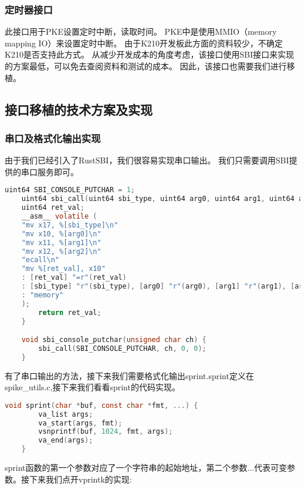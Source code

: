 \subsubsection{定时器接口}

此接口用于PKE设置定时中断，读取时间。
PKE中是使用MMIO（memory mapping IO）来设置定时中断。
由于K210开发板此方面的资料较少，不确定K210是否支持此方式。
从减少开发成本的角度考虑，该接口使用SBI接口来实现的方案最低，可以免去查阅资料和测试的成本。
因此，该接口也需要我们进行移植。

\subsection{接口移植的技术方案及实现}

\subsubsection{串口及格式化输出实现}

由于我们已经引入了RustSBI，我们很容易实现串口输出。
我们只需要调用SBI提供的串口服务即可。

\begin{lstlisting}[language=C, caption={串口实现代码}, label={lst:serial_output} ]
    uint64 SBI_CONSOLE_PUTCHAR = 1;
    uint64 sbi_call(uint64 sbi_type, uint64 arg0, uint64 arg1, uint64 arg2) {
    uint64 ret_val;
    __asm__ volatile (
    "mv x17, %[sbi_type]\n"
    "mv x10, %[arg0]\n"
    "mv x11, %[arg1]\n"
    "mv x12, %[arg2]\n"
    "ecall\n"
    "mv %[ret_val], x10"
    : [ret_val] "=r"(ret_val)
    : [sbi_type] "r"(sbi_type), [arg0] "r"(arg0), [arg1] "r"(arg1), [arg2] "r"(arg2)
    : "memory"
    );
        return ret_val;
    }

    void sbi_console_putchar(unsigned char ch) {
        sbi_call(SBI_CONSOLE_PUTCHAR, ch, 0, 0);
    }
\end{lstlisting}

有了串口输出的方法，接下来我们需要格式化输出sprint.sprint定义在spike\_utils.c,接下来我们看看sprint的代码实现。

\begin{lstlisting}[language=C, caption={sprint实现代码}, label={lst:sprint} ]
    void sprint(char *buf, const char *fmt, ...) {
        va_list args;
        va_start(args, fmt);
        vsnprintf(buf, 1024, fmt, args);
        va_end(args);
    }
\end{lstlisting}

sprint函数的第一个参数对应了一个字符串的起始地址，第二个参数...代表可变参数。接下来我们点开vprintk的实现:

